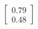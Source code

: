 \documentclass[preview]{standalone}
\begin{document}
\begin{align*}
\begin{bmatrix} 0.79 \\ 0.48 \end{bmatrix}
\end{align*}
\end{document}
